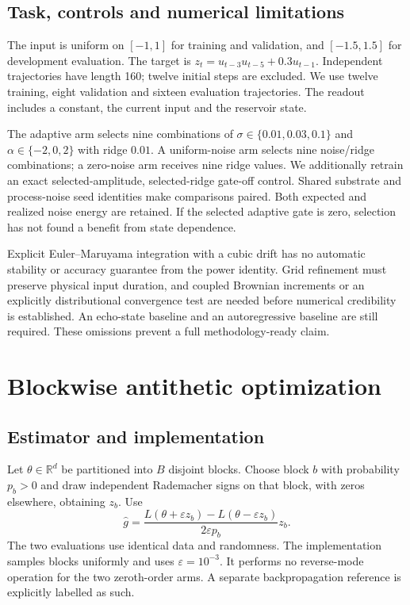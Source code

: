 \documentclass[10pt]{article}
\newcommand{\R}{\mathbb{R}}
\begin{document}
\subsection{Task, controls and numerical limitations}
The input is uniform on $[-1,1]$ for training and validation, and $[-1.5,1.5]$ for development evaluation. The target is $z_t=u_{t-3}u_{t-5}+0.3u_{t-1}$. Independent trajectories have length 160; twelve initial steps are excluded. We use twelve training, eight validation and sixteen evaluation trajectories. The readout includes a constant, the current input and the reservoir state.

The adaptive arm selects nine combinations of $\sigma\in\{0.01,0.03,0.1\}$ and $\alpha\in\{-2,0,2\}$ with ridge $0.01$. A uniform-noise arm selects nine noise/ridge combinations; a zero-noise arm receives nine ridge values. We additionally retrain an exact selected-amplitude, selected-ridge gate-off control. Shared substrate and process-noise seed identities make comparisons paired. Both expected and realized noise energy are retained. If the selected adaptive gate is zero, selection has not found a benefit from state dependence.

Explicit Euler--Maruyama integration with a cubic drift has no automatic stability or accuracy guarantee from the power identity. Grid refinement must preserve physical input duration, and coupled Brownian increments or an explicitly distributional convergence test are needed before numerical credibility is established. An echo-state baseline and an autoregressive baseline are still required. These omissions prevent a full methodology-ready claim.

\section{Blockwise antithetic optimization}
\subsection{Estimator and implementation}
Let $\theta\in\R^d$ be partitioned into $B$ disjoint blocks. Choose block $b$ with probability $p_b>0$ and draw independent Rademacher signs on that block, with zeros elsewhere, obtaining $z_b$. Use
\begin{equation}
 \widehat g=\frac{L(\theta+\varepsilon z_b)-L(\theta-\varepsilon z_b)}{2\varepsilon p_b}z_b.
\end{equation}
The two evaluations use identical data and randomness. The implementation samples blocks uniformly and uses $\varepsilon=10^{-3}$. It performs no reverse-mode operation for the two zeroth-order arms. A separate backpropagation reference is explicitly labelled as such.
\end{document}
